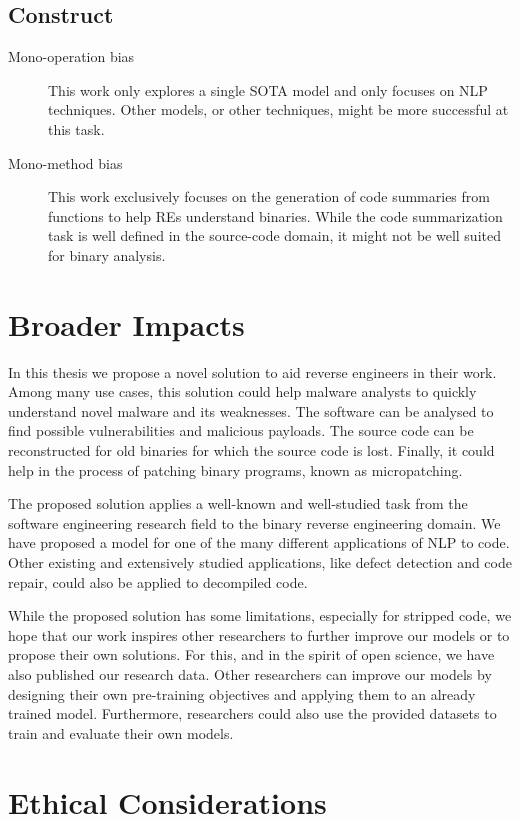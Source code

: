 \subsection{Construct}
    \begin{description}
        \item[Mono-operation bias] This work only explores a single SOTA model and only focuses on NLP techniques. Other models, or other techniques, might be more successful at this task.
        \item[Mono-method bias] This work exclusively focuses on the generation of code summaries from functions to help REs understand binaries. While the code summarization task is well defined in the source-code domain, it might not be well suited for binary analysis.
    \end{description}


\section{Broader Impacts}
In this thesis we propose a novel solution to aid reverse engineers in their work. Among many use cases, this solution could help malware analysts to quickly understand novel malware and its weaknesses. The software can be analysed to find possible vulnerabilities and malicious payloads. The source code can be reconstructed for old binaries for which the source code is lost. Finally, it could help in the process of patching binary programs, known as micropatching.

The proposed solution applies a well-known and well-studied task from the software engineering research field to the binary reverse engineering domain. We have proposed a model for one of the many different applications of NLP to code. Other existing and extensively studied applications, like defect detection and code repair, could also be applied to decompiled code. 

While the proposed solution has some limitations, especially for stripped code, we hope that our work inspires other researchers to further improve our models or to propose their own solutions. For this, and in the spirit of open science, we have also published our research data. Other researchers can improve our models by designing their own pre-training objectives and applying them to an already trained model. Furthermore, researchers could also use the provided datasets to train and evaluate their own models.

\section{Ethical Considerations}
